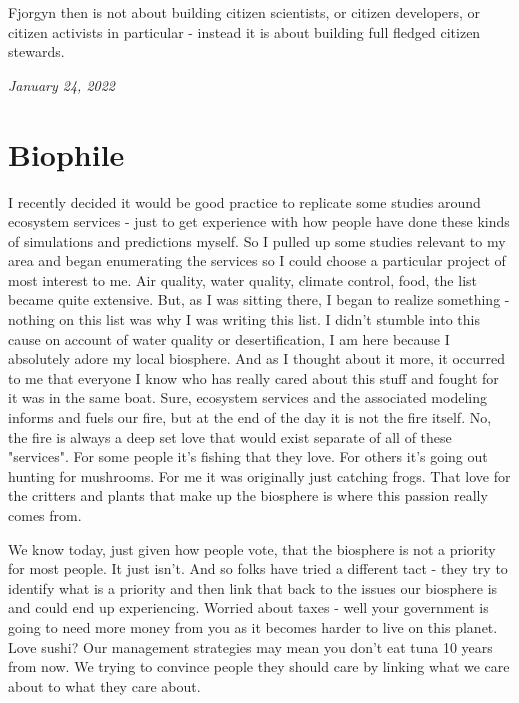 \documentclass[10pt,a5paper]{book}
\begin{document}
Fjorgyn then is not about building citizen scientists, or citizen developers, or citizen activists in particular - instead it is about building full fledged citizen stewards.


\textit{January 24, 2022}

\section{Biophile}
I recently decided it would be good practice to replicate some studies around ecosystem services - just to get experience with how people have done these kinds of simulations and predictions myself. So I pulled up some studies relevant to my area and began enumerating the services so I could choose a particular project of most interest to me. Air quality, water quality, climate control, food, the list became quite extensive. But, as I was sitting there, I began to realize something - nothing on this list was why I was writing this list. I didn't stumble into this cause on account of water quality or desertification, I am here because I absolutely adore my local biosphere. And as I thought about it more, it occurred to me that everyone I know who has really cared about this stuff and fought for it was in the same boat. Sure, ecosystem services and the associated modeling informs and fuels our fire, but at the end of the day it is not the fire itself. No, the fire is always a deep set love that would exist separate of all of these "services". For some people it's fishing that they love. For others it's going out hunting for mushrooms. For me it was originally just catching frogs. That love for the critters and plants that make up the biosphere is where this passion really comes from. 

We know today, just given how people vote, that the biosphere is not a priority for most people. It just isn't. And so folks have tried a different tact - they try to identify what is a priority and then link that back to the issues our biosphere is and could end up experiencing. Worried about taxes - well your government is going to need more money from you as it becomes harder to live on this planet. Love sushi? Our management strategies may mean you don't eat tuna 10 years from now. We trying to convince people they should care by linking what we care about to what they care about. 
\end{document}
